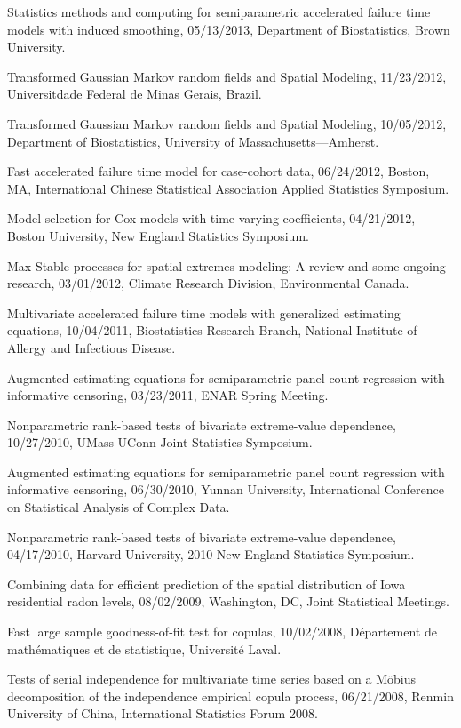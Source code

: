 \documentclass[Statistics]{vita}
\begin{document}
\begin{vita}
\begin{InvitedTalks}
  \item Statistics methods and computing for semiparametric accelerated failure time models with induced smoothing, 05/13/2013, Department of Biostatistics, Brown University.
  \item Transformed Gaussian Markov random fields and Spatial Modeling, 11/23/2012, Universitdade Federal de Minas Gerais, Brazil.
  \item Transformed Gaussian Markov random fields and Spatial Modeling, 10/05/2012, Department of Biostatistics, University of Massachusetts---Amherst.
  \item Fast accelerated failure time model for case-cohort data, 06/24/2012, Boston, MA, International Chinese Statistical Association Applied Statistics Symposium.
  \item Model selection for Cox models with time-varying coefficients, 04/21/2012, Boston University, New England Statistics Symposium.
  \item Max-Stable processes for spatial extremes modeling: A review and some ongoing research, 03/01/2012, Climate Research Division, Environmental Canada.
  \item Multivariate accelerated failure time models with generalized estimating equations, 10/04/2011, Biostatistics Research Branch, National Institute of Allergy and Infectious Disease.
  \item Augmented estimating equations for semiparametric panel count regression with informative censoring, 03/23/2011, ENAR Spring Meeting.
  \item Nonparametric rank-based tests of bivariate extreme-value dependence, 10/27/2010, UMass-UConn Joint Statistics Symposium.
  \item Augmented estimating equations for semiparametric panel count regression with informative censoring, 06/30/2010, Yunnan University, International Conference on Statistical Analysis of Complex Data.
  \item Nonparametric rank-based tests of bivariate extreme-value dependence, 04/17/2010, Harvard University, 2010 New England Statistics Symposium.
  \item Combining data for efficient prediction of the spatial distribution of Iowa residential radon levels, 08/02/2009, Washington, DC, Joint Statistical Meetings.
  \item Fast large sample goodness-of-fit test for copulas, 10/02/2008, D\'epartement de math\'ematiques et de statistique, Universit\'e Laval.
  \item Tests of serial independence for multivariate time series based on a M\"obius decomposition of the independence empirical copula process, 06/21/2008, Renmin University of China, International Statistics Forum 2008.

\end{InvitedTalks}
\end{vita}
\end{document}

